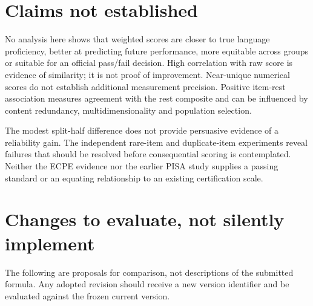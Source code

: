 \documentclass[11pt,a4paper,oneside,headings=normal,parskip=half]{scrreprt}
\begin{document}
\section{Claims not established}
No analysis here shows that weighted scores are closer to true language proficiency, better at predicting future performance, more equitable across groups or suitable for an official pass/fail decision. High correlation with raw score is evidence of similarity; it is not proof of improvement. Near-unique numerical scores do not establish additional measurement precision. Positive item-rest association measures agreement with the rest composite and can be influenced by content redundancy, multidimensionality and population selection.

The modest split-half difference does not provide persuasive evidence of a reliability gain. The independent rare-item and duplicate-item experiments reveal failures that should be resolved before consequential scoring is contemplated. Neither the ECPE evidence nor the earlier PISA study supplies a passing standard or an equating relationship to an existing certification scale.

\section{Changes to evaluate, not silently implement}
The following are proposals for comparison, not descriptions of the submitted formula. Any adopted revision should receive a new version identifier and be evaluated against the frozen current version.
\end{document}
